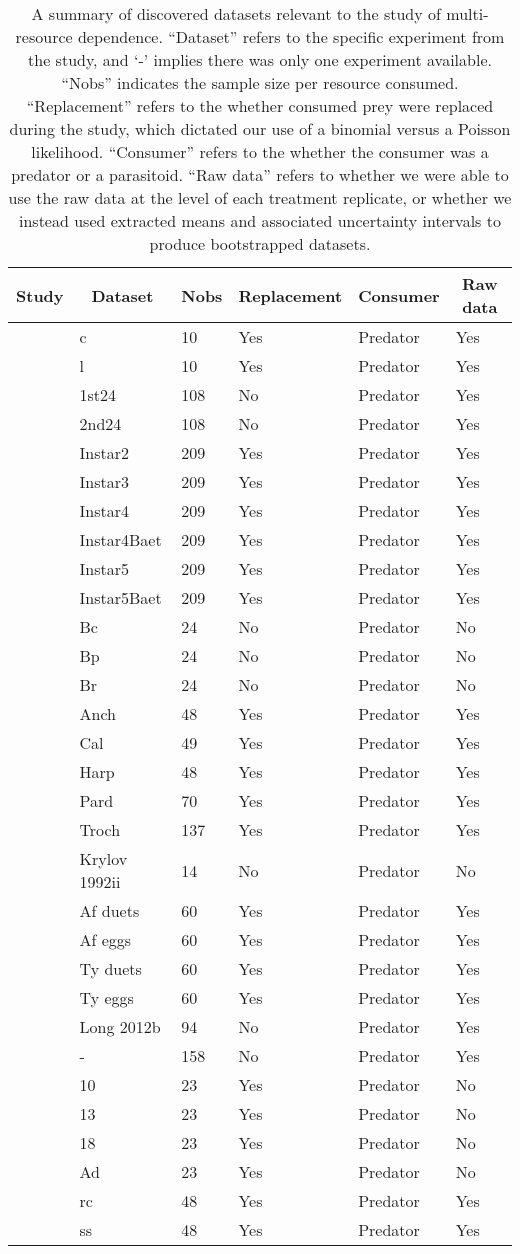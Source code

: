 \begin{table}[!tbp]
\caption{
      A summary of discovered datasets relevant to the study of multi-resource dependence.
      ``Dataset'' refers to the specific experiment from the study, and `-' implies there was only one experiment available.
      ``Nobs'' indicates the sample size per resource consumed.
      ``Replacement'' refers to the whether consumed prey were replaced during the study, which dictated our use of a binomial versus a Poisson likelihood.
      ``Consumer'' refers to the whether the consumer was a predator or a parasitoid.
      ``Raw data'' refers to whether we were able to use the raw data at the level of each treatment replicate, or whether we instead used extracted means and associated uncertainty intervals to produce bootstrapped datasets.
    \label{table:datasets}} 
\begin{center}
\begin{tabular}{llllll}
\hline\hline
\multicolumn{1}{c}{Study}&\multicolumn{1}{c}{Dataset}&\multicolumn{1}{c}{Nobs}&\multicolumn{1}{c}{Replacement}&\multicolumn{1}{c}{Consumer}&\multicolumn{1}{c}{Raw data}\tabularnewline
\hline
\citet{Chan:2017aa}&c&10&Yes&Predator&Yes\tabularnewline
\citet{Chan:2017aa}&l&10&Yes&Predator&Yes\tabularnewline
\citet{Colton:1987aa}&1st24&108&No&Predator&Yes\tabularnewline
\citet{Colton:1987aa}&2nd24&108&No&Predator&Yes\tabularnewline
\citet{Elliott:2006aa}&Instar2&209&Yes&Predator&Yes\tabularnewline
\citet{Elliott:2006aa}&Instar3&209&Yes&Predator&Yes\tabularnewline
\citet{Elliott:2006aa}&Instar4&209&Yes&Predator&Yes\tabularnewline
\citet{Elliott:2006aa}&Instar4Baet&209&Yes&Predator&Yes\tabularnewline
\citet{Elliott:2006aa}&Instar5&209&Yes&Predator&Yes\tabularnewline
\citet{Elliott:2006aa}&Instar5Baet&209&Yes&Predator&Yes\tabularnewline
\citet{Iyer:1996aa}&Bc&24&No&Predator&No\tabularnewline
\citet{Iyer:1996aa}&Bp&24&No&Predator&No\tabularnewline
\citet{Iyer:1996aa}&Br&24&No&Predator&No\tabularnewline
\citet{Kalinkat:2011bd}&Anch&48&Yes&Predator&Yes\tabularnewline
\citet{Kalinkat:2011bd}&Cal&49&Yes&Predator&Yes\tabularnewline
\citet{Kalinkat:2011bd}&Harp&48&Yes&Predator&Yes\tabularnewline
\citet{Kalinkat:2011bd}&Pard&70&Yes&Predator&Yes\tabularnewline
\citet{Kalinkat:2011bd}&Troch&137&Yes&Predator&Yes\tabularnewline
\citet{Krylov:1992aa}&Krylov 1992ii&14&No&Predator&No\tabularnewline
\citet{Lester:2002aa}&Af duets&60&Yes&Predator&Yes\tabularnewline
\citet{Lester:2002aa}&Af eggs&60&Yes&Predator&Yes\tabularnewline
\citet{Lester:2002aa}&Ty duets&60&Yes&Predator&Yes\tabularnewline
\citet{Lester:2002aa}&Ty eggs&60&Yes&Predator&Yes\tabularnewline
\citet{Long:2012aa}&Long 2012b&94&No&Predator&Yes\tabularnewline
\citet{Nachappa:2006aa}&-&158&No&Predator&Yes\tabularnewline
\citet{Ranta:1985aa}&10&23&Yes&Predator&No\tabularnewline
\citet{Ranta:1985aa}&13&23&Yes&Predator&No\tabularnewline
\citet{Ranta:1985aa}&18&23&Yes&Predator&No\tabularnewline
\citet{Ranta:1985aa}&Ad&23&Yes&Predator&No\tabularnewline
\citet{Wong:2005aa}&rc&48&Yes&Predator&Yes\tabularnewline
\citet{Wong:2005aa}&ss&48&Yes&Predator&Yes\tabularnewline
\hline
\end{tabular}\end{center}
\end{table}
